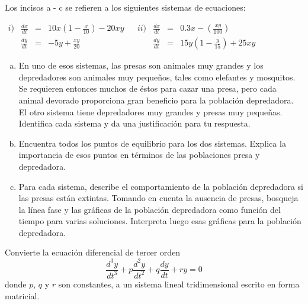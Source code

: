\documentclass[12pt]{exam}
\begin{document}
\begin{questions}
     \question%
     Los incisos a - c se refieren a los siguientes sistemas de ecuaciones:
     
     $
     \begin{array}{lrclclrcl}
        i)&\frac{dx}{dt}& = & 10x\left(1-\frac{x}{10}\right)-20xy& &ii)& \frac{dx}{dt} & = & 0.3x-\left(\frac{xy}{100}\right)\\
        & \frac{dy}{dt} & = & -5y+\frac{xy}{20} & & &\frac{dy}{dt}& = & 15y\left(1-\frac{y}{15}\right)+25xy
     \end{array}
     $
     \begin{enumerate}[a)]
         \item En uno de esos sistemas, las presas son animales muy grandes y los depredadores son animales muy pequeños, tales como elefantes y mosquitos. Se requieren entonces muchos de éstos para cazar una presa, pero cada animal devorado proporciona gran beneficio para la población depredadora. El otro sistema tiene depredadores muy grandes y presas muy pequeñas. Identifica cada sistema y da una justificación para tu respuesta.
         \item Encuentra todos los puntos de equilibrio para los dos sistemas. Explica la importancia de esos puntos en términos de las poblaciones presa y depredadora.
         \item Para cada sistema, describe el comportamiento de la población depredadora si las presas están extintas. Tomando en cuenta la ausencia de presas, bosqueja la línea fase y las gráficas de la población depredadora como función del tiempo para varias soluciones. Interpreta luego esas gráficas para la población depredadora.
     \end{enumerate}

     \question%
     Convierte la ecuación diferencial de tercer orden $$\frac{d^3y}{dt^3}+p\frac{d^2y}{dt^2}+q\frac{dy}{dt}+ry=0$$ donde $p$, $q$ y $r$ son constantes, a un sistema lineal tridimensional escrito en forma matricial.


\end{questions}
\end{document}
